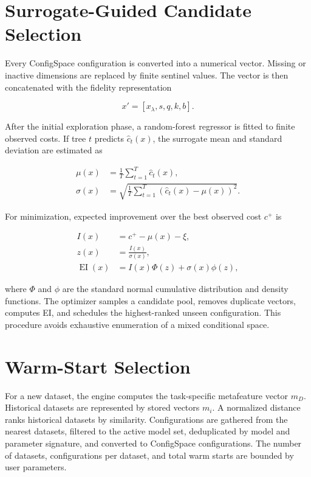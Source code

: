 \documentclass[12pt,a4paper,oneside]{report}
\begin{document}
\section{Surrogate-Guided Candidate Selection}

Every ConfigSpace configuration is converted into a numerical vector. Missing
or inactive dimensions are replaced by finite sentinel values. The vector is
then concatenated with the fidelity representation

\begin{equation}
  x' = [x_{\lambda}, s, q, k, b].
\end{equation}

\medskip
\noindent After the initial exploration phase, a random-forest regressor is fitted to
finite observed costs. If tree $t$ predicts $\hat{c}_t(x)$, the surrogate mean
and standard deviation are estimated as

\begin{align}
  \mu(x) &= \frac{1}{T}\sum_{t=1}^{T}\hat{c}_t(x), \\
  \sigma(x) &= \sqrt{\frac{1}{T}\sum_{t=1}^{T}
  \left(\hat{c}_t(x)-\mu(x)\right)^2}.
\end{align}

For minimization, expected improvement over the best observed cost $c^+$ is

\begin{align}
  I(x) &= c^+ - \mu(x) - \xi, \\
  z(x) &= \frac{I(x)}{\sigma(x)}, \\
  \operatorname{EI}(x) &= I(x)\Phi(z) + \sigma(x)\phi(z),
\end{align}

\medskip

\noindent where $\Phi$ and $\phi$ are the standard normal cumulative distribution and
density functions. The optimizer samples a candidate pool, removes duplicate
vectors, computes EI, and schedules the highest-ranked unseen configuration.
This procedure avoids exhaustive enumeration of a mixed conditional space.

\section{Warm-Start Selection}

For a new dataset, the engine computes the task-specific metafeature vector
$m_D$. Historical datasets are represented by stored vectors $m_i$. A
normalized distance ranks historical datasets by similarity. Configurations
are gathered from the nearest datasets, filtered to the active model set,
deduplicated by model and parameter signature, and converted to ConfigSpace
configurations. The number of datasets, configurations per dataset, and total
warm starts are bounded by user parameters.
\end{document}
